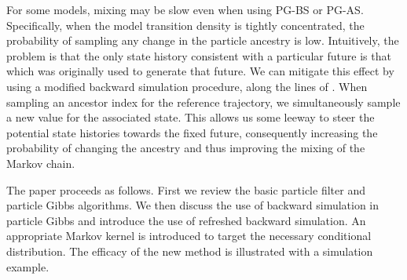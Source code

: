 \documentclass{article}
\newtheorem{theorem}{Theorem}[section]
\newcommand{\pr}{\theta}
\newcommand{\prspace}{\Theta}
\newcommand{\ls}[1]{x_{#1}}
\newcommand{\lsspace}{\mathcal{X}}
\newcommand{\ed}{\pi}
\newcommand{\pss}[1]{^{(#1)}}
\begin{document}
For some models, mixing may be slow even when using PG-BS or PG-AS. Specifically, when the model transition density is tightly concentrated, the probability of sampling any change in the particle ancestry is low. Intuitively, the problem is that the only state history consistent with a particular future is that which was originally used to generate that future. We can mitigate this effect by using a modified backward simulation procedure, along the lines of \cite{Bunch2013}. When sampling an ancestor index for the reference trajectory, we simultaneously sample a new value for the associated state. This allows us some leeway to steer the potential state histories towards the fixed future, consequently increasing the probability of changing the ancestry and thus improving the mixing of the Markov chain.

The paper proceeds as follows. First we review the basic particle filter and particle Gibbs algorithms. We then discuss the use of backward simulation in particle Gibbs and introduce the use of refreshed backward simulation. An appropriate Markov kernel is introduced to target the necessary conditional distribution. The efficacy of the new method is illustrated with a simulation example.



% 
% 
% 
% 
% 
\end{document}
